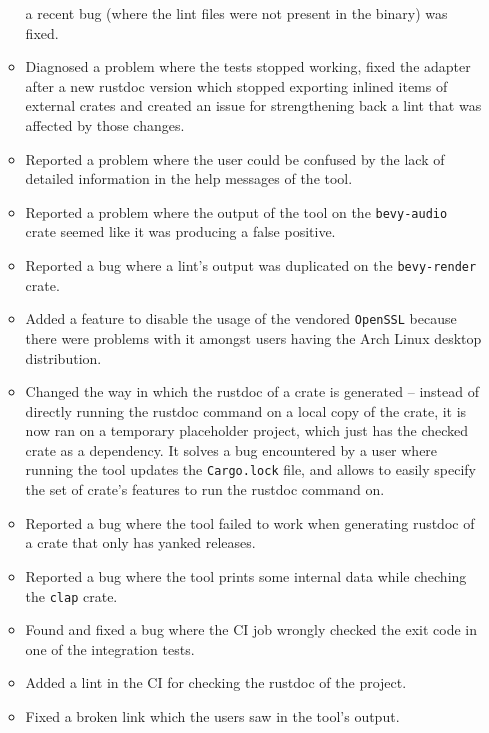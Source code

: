 \documentclass[licencjacka,en]{pracamgr}
\begin{document}
\begin{itemize}
\begin{itemize}
				a recent bug (where the lint files were not present in the binary) was fixed.
			\item Diagnosed a problem where the tests stopped working, fixed the adapter after
				a new rustdoc version which stopped exporting inlined items of external crates
				and created an issue for strengthening back a lint that was affected
				by those changes.
			\item Reported a problem where the user could be confused by the lack of detailed
				information in the help messages of the tool.
			\item Reported a problem where the output of the tool on the \texttt{bevy-audio} crate
				seemed like it was producing a false positive.
			\item Reported a bug where a lint's output was duplicated on the
				\texttt{bevy-render} crate.
			\item Added a feature to disable the usage of the vendored \texttt{OpenSSL} because
				there were problems with it amongst users having the Arch Linux desktop distribution.
			\item Changed the way in which the rustdoc of a crate is generated -- instead of
				directly running the rustdoc command on a local copy of the crate, it is now ran
				on a temporary placeholder project, which just has the checked crate as
				a dependency. It solves a bug encountered by a user where running the tool updates
				the \texttt{Cargo.lock} file, and allows to easily specify the set of
				crate's features to run the rustdoc command on.
			\item Reported a bug where the tool failed to work when generating rustdoc of a crate
				that only has yanked releases.
			\item Reported a bug where the tool prints some internal data while cheching
				the \texttt{clap} crate.
			\item Found and fixed a bug where the CI job wrongly checked the exit code in one
				of the integration tests.
			\item Added a lint in the CI for checking the rustdoc of the project.
			\item Fixed a broken link which the users saw in the tool's output.

\end{itemize}
\end{itemize}
\end{document}
